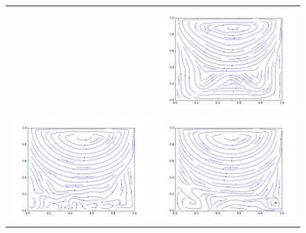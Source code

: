 \begin{figure}
\begin{tabulary}{\linewidth}{c c}
		&
		\includegraphics[width=\figwid]{figs/lid/bingham_100_bgk-filter_Bn10_Re100/sl_step-000050000}
		\\
		\includegraphics[width=\figwid]{figs/lid/bingham_100_mrt-8_Bn10_Re100/sl_step-000050000}
		&
		\includegraphics[width=\figwid]{figs/lid/bingham_100_mrt-filter_Bn10_Re100/sl_step-000050000}

\end{tabulary}
\end{figure}
